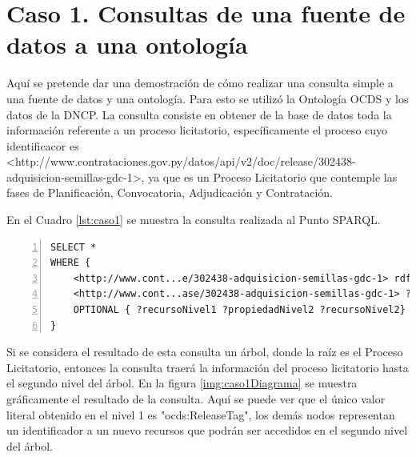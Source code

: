 \section{Caso 1. Consultas de una fuente de datos a una ontología}
\label{section:caso1}


Aquí se pretende dar una demostración de cómo realizar una consulta simple a una fuente de datos y una ontología. Para esto se utilizó la Ontología OCDS y los datos de la DNCP. La consulta consiste en obtener de la base de datos toda la información referente a un proceso licitatorio, específicamente el proceso cuyo identificacor es <http://www.contrataciones.gov.py/datos/api/v2/doc/release/302438-adquisicion-semillas-gdc-1>, ya que es un Proceso Licitatorio que contemple las fases de Planificación, Convocatoria, Adjudicación y Contratación.

En el Cuadro \ref{lst:caso1} se muestra la consulta realizada al Punto SPARQL.

\noindent\begin{minipage}[t]{\textwidth}
\begin{lstlisting}[captionpos=b, caption={Tripas referentes al proceso licitatorio cuyo identificador es 302438}, label={lst:caso1},  numbers=left,  numberstyle=\tiny\color{mygray},frame=single]
SELECT *  
WHERE {    	
    <http://www.cont...e/302438-adquisicion-semillas-gdc-1> rdf:type ocds:Release .
    <http://www.cont...ase/302438-adquisicion-semillas-gdc-1> ?propiedadNivel1 ?recursoNivel1 .   
    OPTIONAL { ?recursoNivel1 ?propiedadNivel2 ?recursoNivel2}
}  
 \end{lstlisting}
\end{minipage}

 Si se considera el resultado de esta consulta un árbol, donde la raíz es el Proceso Licitatorio, entonces la consulta traerá la información del proceso licitatorio hasta el segundo nivel del árbol. En la figura \ref{img:caso1Diagrama} se muestra gráficamente el resultado de la consulta. Aquí se puede ver que el único valor literal obtenido en el nivel 1 es "ocds:ReleaseTag", los demás nodos representan un identificador a un nuevo recursos que podrán ser accedidos en el segundo nivel del árbol.
 
